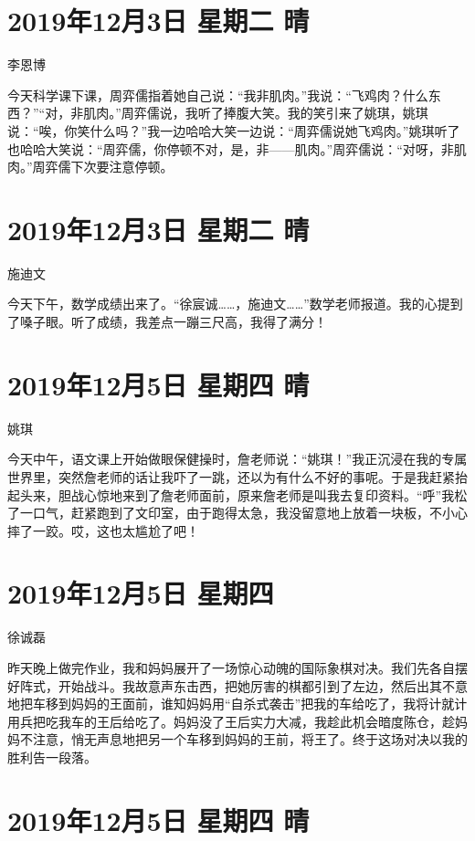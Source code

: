 \section{2019年12月3日 星期二 晴}

李恩博

今天科学课下课，周弈儒指着她自己说：``我非肌肉。''我说：``飞鸡肉？什么东西？''``对，非肌肉。''周弈儒说，我听了捧腹大笑。我的笑引来了姚琪，姚琪说：``唉，你笑什么吗？''我一边哈哈大笑一边说：``周弈儒说她飞鸡肉。''姚琪听了也哈哈大笑说：``周弈儒，你停顿不对，是，非------肌肉。''周弈儒说：``对呀，非肌肉。''周弈儒下次要注意停顿。

\section{2019年12月3日 星期二 晴}

施迪文

今天下午，数学成绩出来了。``徐宸诚\ldots\ldots，施迪文\ldots\ldots{}''数学老师报道。我的心提到了嗓子眼。听了成绩，我差点一蹦三尺高，我得了满分！

\section{2019年12月5日 星期四 晴}

姚琪

今天中午，语文课上开始做眼保健操时，詹老师说：``姚琪！''我正沉浸在我的专属世界里，突然詹老师的话让我吓了一跳，还以为有什么不好的事呢。于是我赶紧抬起头来，胆战心惊地来到了詹老师面前，原来詹老师是叫我去复印资料。``呼''我松了一口气，赶紧跑到了文印室，由于跑得太急，我没留意地上放着一块板，不小心摔了一跤。哎，这也太尴尬了吧！

\section{2019年12月5日 星期四}

徐诚磊

昨天晚上做完作业，我和妈妈展开了一场惊心动魄的国际象棋对决。我们先各自摆好阵式，开始战斗。我故意声东击西，把她厉害的棋都引到了左边，然后出其不意地把车移到妈妈的王面前，谁知妈妈用``自杀式袭击''把我的车给吃了，我将计就计用兵把吃我车的王后给吃了。妈妈没了王后实力大减，我趁此机会暗度陈仓，趁妈妈不注意，悄无声息地把另一个车移到妈妈的王前，将王了。终于这场对决以我的胜利告一段落。

\section{2019年12月5日 星期四 晴}

